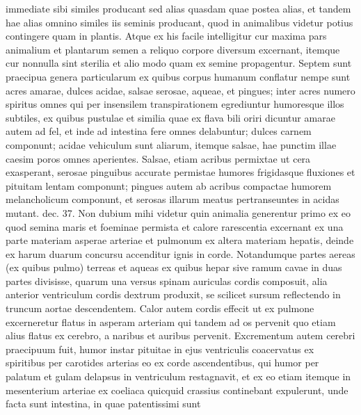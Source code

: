 \pstart\noindent immediate sibi similes producant sed alias quasdam quae postea alias, et tandem hae alias omnino similes iis seminis producant, quod in animalibus videtur potius contingere quam in plantis.
\pend 
\pstart Atque ex his facile intelligitur cur maxima pars animalium et plantarum semen a reliquo corpore diversum excernant, itemque cur nonnulla sint sterilia et alio modo quam ex semine propagentur.
\pend 
\pstart Septem sunt praecipua genera particularum ex quibus corpus humanum conflatur nempe sunt acres amarae, dulces acidae, salsae serosae, aqueae, et pingues; inter acres numero spiritus omnes qui per insensilem transpirationem egrediuntur humoresque illos subtiles, ex quibus pustulae et similia quae ex flava bili oriri dicuntur amarae autem ad fel, et inde ad intestina fere omnes delabuntur; dulces carnem componunt; acidae vehiculum sunt aliarum, itemque salsae, hae punctim illae caesim poros omnes aperientes. Salsae, etiam acribus permixtae ut cera exasperant, serosae pinguibus accurate permistae humores frigidasque fluxiones et pituitam lentam componunt; pingues autem ab acribus compactae humorem melancholicum componunt, et serosas illarum meatus pertranseuntes in acidas mutant.
\pend%
\count{}
\count{}
\pstart%
\noindent%
dec. 37. Non dubium mihi videtur quin animalia generentur primo ex eo quod semina maris et foeminae permista et calore rarescentia excernant ex una parte materiam asperae arteriae et pulmonum ex altera materiam hepatis, deinde ex harum duarum concursu accenditur ignis in corde. Notandumque partes aereas (ex quibus pulmo) terreas et aqueas ex quibus hepar sive ramum cavae in duas partes divisisse, quarum una versus spinam auriculas cordis composuit, alia anterior ventriculum cordis dextrum produxit, se scilicet sursum reflectendo in truncum aortae descendentem. Calor autem cordis effecit ut ex pulmone excerneretur flatus in asperam arteriam qui tandem ad os pervenit quo etiam alius flatus ex cerebro, a naribus et auribus pervenit. Excrementum autem cerebri praecipuum fuit, humor instar pituitae in ejus ventriculis coacervatus ex spiritibus per carotides arterias eo ex corde ascendentibus, qui humor per palatum et gulam delapsus in ventriculum restagnavit, et ex eo etiam itemque in mesenterium arteriae ex coeliaca quicquid crassius continebant expulerunt, unde facta sunt intestina, in quae patentissimi sunt
